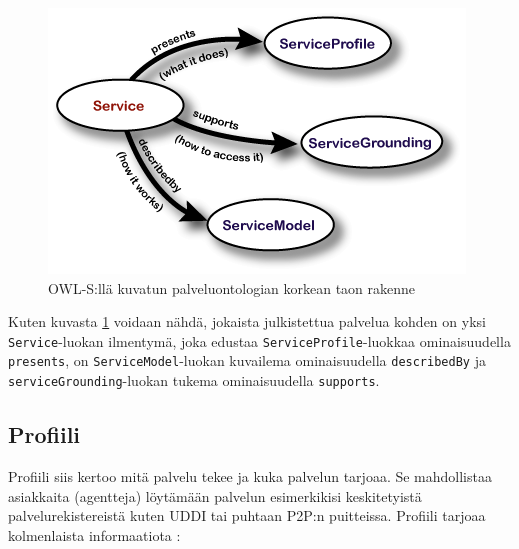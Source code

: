 \documentclass[finnish]{tktltiki2}
\theoremstyle{definition}
\theoremstyle{remark}
\begin{document}
 \begin{figure}[ht]
 \centering
 \includegraphics[scale=0.60]{karkea_taso.png}
 \caption{OWL-S:llä kuvatun palveluontologian korkean taon rakenne \cite{OWLS}}
 \label{karkea_taso}
\end{figure}
 
 Kuten kuvasta \ref{karkea_taso}  voidaan nähdä, jokaista julkistettua palvelua kohden on yksi \texttt{Service}-luokan ilmentymä, joka edustaa \texttt{ServiceProfile}-luokkaa ominaisuudella \texttt{presents}, on \texttt{ServiceModel}-luokan kuvailema ominaisuudella \texttt{describedBy} ja \texttt{serviceGrounding}-luokan tukema ominaisuudella \texttt{supports}.


\subsection{Profiili}

Profiili siis kertoo mitä palvelu tekee ja kuka palvelun tarjoaa. Se mahdollistaa asiakkaita (agentteja) löytämään palvelun esimerkikisi keskitetyistä palvelurekistereistä kuten UDDI tai puhtaan P2P:n puitteissa. 
Profiili tarjoaa kolmenlaista informaatiota \cite{OWLS}:
\end{document}
